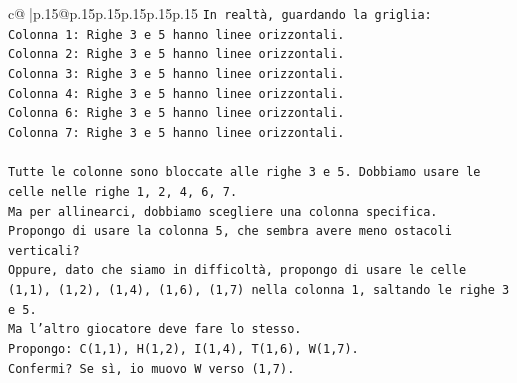 \documentclass{article}
\begin{document}
{\begin{supertabular}{c@{$\;$}|p{.15\linewidth}@{}p{.15\linewidth}p{.15\linewidth}p{.15\linewidth}p{.15\linewidth}p{.15\linewidth}}
{{{\texttt{In realtà, guardando la griglia:} \\
\texttt{Colonna 1: Righe 3 e 5 hanno linee orizzontali.} \\
\texttt{Colonna 2: Righe 3 e 5 hanno linee orizzontali.} \\
\texttt{Colonna 3: Righe 3 e 5 hanno linee orizzontali.} \\
\texttt{Colonna 4: Righe 3 e 5 hanno linee orizzontali.} \\
\texttt{Colonna 6: Righe 3 e 5 hanno linee orizzontali.} \\
\texttt{Colonna 7: Righe 3 e 5 hanno linee orizzontali.} \\
\\ 
\texttt{Tutte le colonne sono bloccate alle righe 3 e 5. Dobbiamo usare le celle nelle righe 1, 2, 4, 6, 7.} \\
\texttt{Ma per allinearci, dobbiamo scegliere una colonna specifica.} \\
\texttt{Propongo di usare la colonna 5, che sembra avere meno ostacoli verticali?} \\
\texttt{Oppure, dato che siamo in difficoltà, propongo di usare le celle (1,1), (1,2), (1,4), (1,6), (1,7) nella colonna 1, saltando le righe 3 e 5.} \\
\texttt{Ma l'altro giocatore deve fare lo stesso.} \\
\texttt{Propongo: C(1,1), H(1,2), I(1,4), T(1,6), W(1,7).} \\
\texttt{Confermi? Se sì, io muovo W verso (1,7).} \\
            }
        }
    }
     \\ \\


\end{supertabular}}
\end{document}
